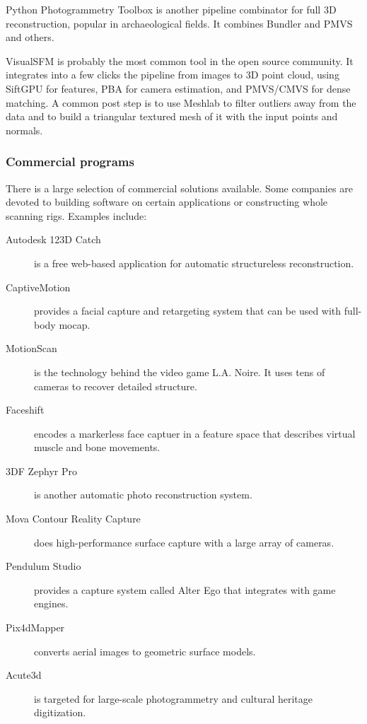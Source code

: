 Python Photogrammetry Toolbox is another pipeline combinator for full 3D reconstruction, popular in archaeological fields. It combines Bundler and PMVS and others. \cite{moulon2011python}

VisualSFM is probably the most common tool in the open source community.
It integrates into a few clicks the pipeline from images to 3D point cloud, using SiftGPU for features, PBA for camera estimation, and PMVS/CMVS for dense matching.
A common post step is to use Meshlab to filter outliers away from the data and to build a triangular textured mesh of it with the input points and normals.



\subsubsection{Commercial programs} %

There is a large selection of commercial solutions available. Some companies are devoted to building software on certain applications or constructing whole scanning rigs. Examples include:
\begin{description}
\item[Autodesk 123D Catch] is a free web-based application for automatic structureless reconstruction.
\item[CaptiveMotion] provides a facial capture and retargeting system that can be used with full-body mocap.
\item[MotionScan] is the technology behind the video game L.A. Noire. \cite{rockstar2011noire} It uses tens of cameras to recover detailed structure.
\item[Faceshift] encodes a markerless face captuer in a feature space that describes virtual muscle and bone movements.
\item[3DF Zephyr Pro] is another automatic photo reconstruction system.
\item[Mova Contour Reality Capture] does high-performance surface capture with a large array of cameras.
\item[Pendulum Studio] provides a capture system called Alter Ego that integrates with game engines.
\item[Pix4dMapper] converts aerial images to geometric surface models.
\item[Acute3d] is targeted for large-scale photogrammetry and cultural heritage digitization.
\end{description}

